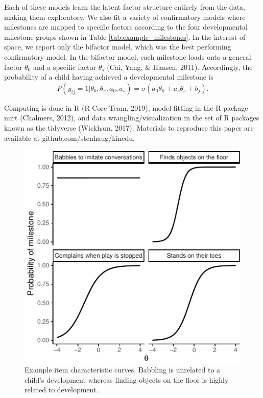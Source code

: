 \documentclass[10pt, letterpaper]{article}
\newenvironment{CodeChunk}{}{}
\begin{document}
Each of these models learn the latent factor structure entirely from the
data, making them exploratory. We also fit a variety of confirmatory
models where milestones are mapped to specific factors according to the
four developmental milestone groups shown in Table
\ref{tab:example_milestones}. In the interest of space, we report only
the bifactor model, which was the best performing confirmatory model. In
the bifactor model, each milestone loads onto a general factor
\(\theta_0\) and a specific factor \(\theta_s\) (Cai, Yang, \& Hansen,
2011). Accordingly, the probability of a child having achieved a
developmental milestone is \[
P(y_{ij} = 1 | \theta_0, \theta_s, a_0, a_s) = \sigma(a_0\theta_0 + a_s\theta_s + b_j).
\]

Computing is done in R (R Core Team, 2019), model fitting in the R
package mirt (Chalmers, 2012), and data wrangling/visualization in the
set of R packages known as the tidyverse (Wickham, 2017). Materials to
reproduce this paper are available at github.com/stenhaug/kinedu.

\begin{CodeChunk}
\begin{figure}[tb]
\includegraphics{figs/icc-1} \caption[Example item characteristic curves]{Example item characteristic curves. Babbling is unrelated to a child's development whereas finding objects on the floor is highly related to development.}\label{fig:icc}
\end{figure}
\end{CodeChunk}
\end{document}
